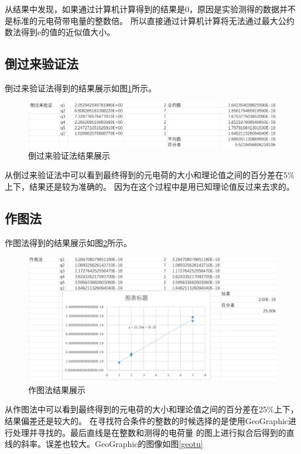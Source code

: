 \documentclass{ctexart}
\begin{document}
  从结果中发现，如果通过计算机计算得到的结果是0，原因是实验测得的数据并不是标准的元电荷带电量的整数倍。
  所以直接通过计算机计算将无法通过最大公约数法得到e的值的近似值大小。
  
  \subsection{倒过来验证法}
  倒过来验证法得到的结果展示如图\ref{fanqiufa}所示。

  \begin{figure}[H]
    \centering
    \includegraphics[height=0.25\textwidth,width=1\textwidth]{fanqiufa.png}
    \caption{倒过来验证法结果展示}\label{fanqiufa}
  \end{figure}

  从倒过来验证法中可以看到最终得到的元电荷的大小和理论值之间的百分差在5\%上下，结果还是较为准确的。
  因为在这个过程中是用已知理论值反过来去求的。

  \subsection{作图法}
  作图法得到的结果展示如图\ref{zuotufa}所示。

  \begin{figure}[H]
    \centering
    \includegraphics[height=0.5\textwidth,width=1\textwidth]{zuotufa.png}
    \caption{作图法结果展示}\label{zuotufa}
  \end{figure}

  从作图法中可以看到最终得到的元电荷的大小和理论值之间的百分差在25\%上下，结果偏差还是较大的。
  在寻找符合条件的整数的时候选择的是使用GeoGraphic进行处理并寻找的。最后直线是在整数和测得的电荷量
  的图上进行拟合后得到的直线的斜率。误差也较大。GeoGraphic的图像如图\ref{geotu}
\end{document}
